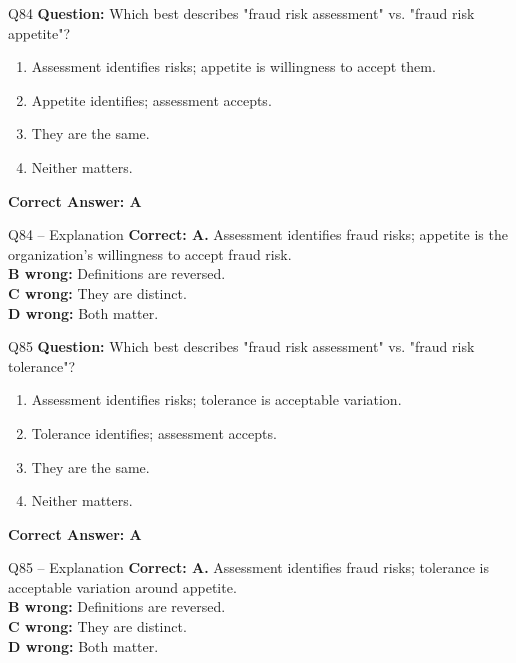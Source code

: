 \documentclass[aspectratio=169,10pt]{beamer}
\begin{document}
	\begin{frame}[t]{Q84}
		\small
		\textbf{Question:} Which best describes "fraud risk assessment" vs. "fraud risk appetite"?
		\begin{enumerate}[label=\Alph*.,itemsep=1pt,topsep=2pt]
			\item Assessment identifies risks; appetite is willingness to accept them.
			\item Appetite identifies; assessment accepts.
			\item They are the same.
			\item Neither matters.
		\end{enumerate}
		\vspace{4pt}
		\textbf{Correct Answer: A}
	\end{frame}
	
	\begin{frame}[t]{Q84 -- Explanation}
		\small
		\textbf{Correct: A.} Assessment identifies fraud risks; appetite is the organization's willingness to accept fraud risk. \\[4pt]
		\textbf{B wrong:} Definitions are reversed. \\[2pt]
		\textbf{C wrong:} They are distinct. \\[2pt]
		\textbf{D wrong:} Both matter.
	\end{frame}
	
	\begin{frame}[t]{Q85}
		\small
		\textbf{Question:} Which best describes "fraud risk assessment" vs. "fraud risk tolerance"?
		\begin{enumerate}[label=\Alph*.,itemsep=1pt,topsep=2pt]
			\item Assessment identifies risks; tolerance is acceptable variation.
			\item Tolerance identifies; assessment accepts.
			\item They are the same.
			\item Neither matters.
		\end{enumerate}
		\vspace{4pt}
		\textbf{Correct Answer: A}
	\end{frame}
	
	\begin{frame}[t]{Q85 -- Explanation}
		\small
		\textbf{Correct: A.} Assessment identifies fraud risks; tolerance is acceptable variation around appetite. \\[4pt]
		\textbf{B wrong:} Definitions are reversed. \\[2pt]
		\textbf{C wrong:} They are distinct. \\[2pt]
		\textbf{D wrong:} Both matter.
	\end{frame}
	
\end{document}
